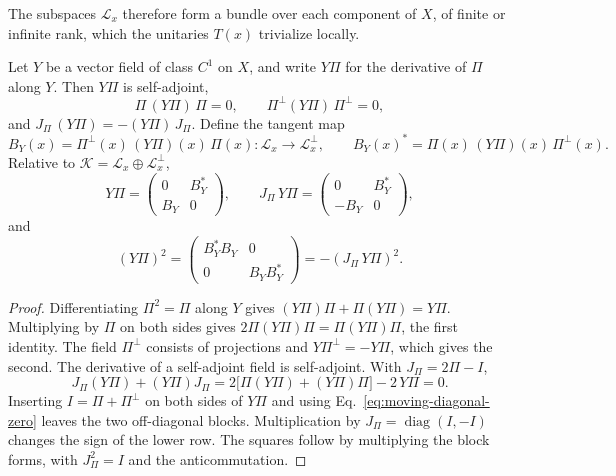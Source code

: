 The subspaces $\mathcal L_x$ therefore form a bundle over each component of $X$, of finite or infinite rank, which the unitaries $T(x)$ trivialize locally.

\begin{proposition}
\label{prop:moving-tangent}
Let $Y$ be a vector field of class $C^1$ on $X$, and write $Y\Pi$ for the derivative of $\Pi$ along $Y$. Then $Y\Pi$ is self-adjoint,
\begin{equation}
 \Pi\,(Y\Pi)\,\Pi=0,\qquad \Pi^\perp(Y\Pi)\,\Pi^\perp=0,
 \label{eq:moving-diagonal-zero}
\end{equation}
and $J_\Pi\,(Y\Pi)=-(Y\Pi)\,J_\Pi$. Define the tangent map
\begin{equation}
 B_Y(x)=\Pi^\perp(x)\,(Y\Pi)(x)\,\Pi(x):\mathcal L_x\to\mathcal L_x^\perp,\qquad
 B_Y(x)^*=\Pi(x)\,(Y\Pi)(x)\,\Pi^\perp(x).
 \label{eq:moving-tangent-map}
\end{equation}
Relative to $\mathcal K=\mathcal L_x\oplus\mathcal L_x^\perp$,
\begin{equation}
 Y\Pi=\begin{pmatrix}0&B_Y^*\\B_Y&0\end{pmatrix},\qquad
 J_\Pi\,Y\Pi=\begin{pmatrix}0&B_Y^*\\-B_Y&0\end{pmatrix},
 \label{eq:moving-block-forms}
\end{equation}
and
\begin{equation}
 (Y\Pi)^2=\begin{pmatrix}B_Y^*B_Y&0\\0&B_YB_Y^*\end{pmatrix}=-(J_\Pi\,Y\Pi)^2 .
 \label{eq:moving-squares}
\end{equation}
\end{proposition}
\begin{proof}
Differentiating $\Pi^2=\Pi$ along $Y$ gives $(Y\Pi)\Pi+\Pi(Y\Pi)=Y\Pi$. Multiplying by $\Pi$ on both sides gives $2\Pi(Y\Pi)\Pi=\Pi(Y\Pi)\Pi$, the first identity. The field $\Pi^\perp$ consists of projections and $Y\Pi^\perp=-Y\Pi$, which gives the second. The derivative of a self-adjoint field is self-adjoint. With $J_\Pi=2\Pi-I$,
\[
 J_\Pi(Y\Pi)+(Y\Pi)J_\Pi=2\bigl[\Pi(Y\Pi)+(Y\Pi)\Pi\bigr]-2\,Y\Pi=0 .
\]
Inserting $I=\Pi+\Pi^\perp$ on both sides of $Y\Pi$ and using Eq.~\eqref{eq:moving-diagonal-zero} leaves the two off-diagonal blocks. Multiplication by $J_\Pi=\operatorname{diag}(I,-I)$ changes the sign of the lower row. The squares follow by multiplying the block forms, with $J_\Pi^2=I$ and the anticommutation.
\end{proof}

